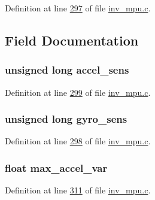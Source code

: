 Definition at line \hyperlink{inv__mpu_8c_source_l00297}{297} of file \hyperlink{inv__mpu_8c_source}{inv\+\_\+mpu.\+c}.



\subsection{Field Documentation}
\subsubsection[{\texorpdfstring{accel\+\_\+sens}{accel_sens}}]{\setlength{\rightskip}{0pt plus 5cm}unsigned long accel\+\_\+sens}\hypertarget{structtest__s_a22a1d8ebbceb431baa0dfdc911fbc8ab}{}\label{structtest__s_a22a1d8ebbceb431baa0dfdc911fbc8ab}


Definition at line \hyperlink{inv__mpu_8c_source_l00299}{299} of file \hyperlink{inv__mpu_8c_source}{inv\+\_\+mpu.\+c}.

\subsubsection[{\texorpdfstring{gyro\+\_\+sens}{gyro_sens}}]{\setlength{\rightskip}{0pt plus 5cm}unsigned long gyro\+\_\+sens}\hypertarget{structtest__s_a32da1174cf6569aa99bdff70055bb45a}{}\label{structtest__s_a32da1174cf6569aa99bdff70055bb45a}


Definition at line \hyperlink{inv__mpu_8c_source_l00298}{298} of file \hyperlink{inv__mpu_8c_source}{inv\+\_\+mpu.\+c}.

\subsubsection[{\texorpdfstring{max\+\_\+accel\+\_\+var}{max_accel_var}}]{\setlength{\rightskip}{0pt plus 5cm}float max\+\_\+accel\+\_\+var}\hypertarget{structtest__s_ad5bc54ab7d1b1a0f158ca1a79359c3bc}{}\label{structtest__s_ad5bc54ab7d1b1a0f158ca1a79359c3bc}


Definition at line \hyperlink{inv__mpu_8c_source_l00311}{311} of file \hyperlink{inv__mpu_8c_source}{inv\+\_\+mpu.\+c}.

